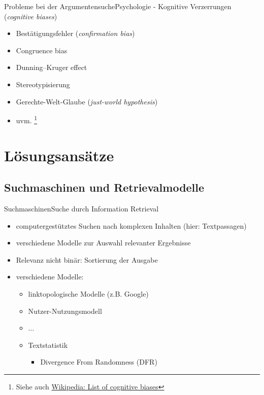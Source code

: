 \documentclass{beamer}
\begin{document}
	\begin{frame}{Probleme bei der Argumentensuche}{Psychologie - Kognitive Verzerrungen (\textit{cognitive biases})}
		\begin{itemize}
			\item Bestätigungsfehler (\textit{confirmation bias})
			\item Congruence bias
			\item Dunning–Kruger effect
			\item Stereotypisierung
			\item Gerechte-Welt-Glaube (\textit{just-world hypothesis})
			\item uvm. \footnote{Siehe auch \href{https://en.wikipedia.org/wiki/List_of_cognitive_biases}{Wikipedia: List of cognitive biases}}
		\end{itemize}
	\end{frame}

	\section{Lösungsansätze}
	\subsection{Suchmaschinen und Retrievalmodelle}

	\begin{frame}{Suchmaschinen}{Suche durch Information Retrieval}
		\begin{itemize}[<+->]
			\item computergestütztes Suchen nach komplexen Inhalten (hier: Textpassagen)
			\item verschiedene Modelle zur Auswahl relevanter Ergebnisse
			\item Relevanz nicht binär: Sortierung der Ausgabe
			\item verschiedene Modelle:
			\begin{itemize}
				\item linktopologische Modelle (z.B. Google)
				\item Nutzer-Nutzungsmodell
				\item $\ldots$
				\item Textstatistik
				\begin{itemize}
					\item Divergence From Randomness (DFR)
				\end{itemize}
			\end{itemize}
		\end{itemize}
	\end{frame}
\end{document}
